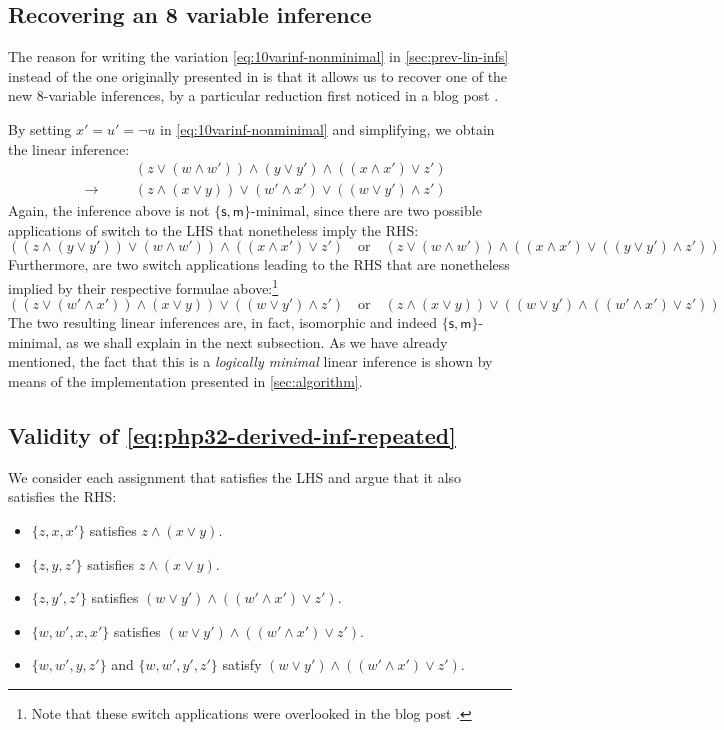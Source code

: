 \documentclass[a4paper, UKenglish, cleveref]{lipics-v2021}
\newcommand{\m}{\ensuremath{\mathsf{m}}}
\newcommand{\s}{\ensuremath{\mathsf{s}}}
\begin{document}
\subsection{Recovering an 8 variable inference}
\label{sect:reduction-10var-to-8var}
The reason for writing the variation \eqref{eq:10varinf-nonminimal} in \cref{sec:prev-lin-infs} instead of the one originally presented in \cite{Das13:lin-inf-rew} is that it allows us to recover one of the new 8-variable inferences, by a particular reduction first noticed in a blog post \cite{Das20:lin-inf-size-8}.

By setting $x' = u' = \lnot u$ in \eqref{eq:10varinf-nonminimal} and simplifying, we obtain the linear inference:
\begin{equation*}
\begin{alignedat}{2}
&&& (z \lor (w \land w')) \land (y \lor y') \land ((x \land x') \lor z') \\
&\to &\quad& (z \land (x \lor y)) \lor (w' \land x') \lor ((w \lor y') \land z')
\end{alignedat}
\end{equation*}
%
Again, the inference above is not $\{\s,\m\}$-minimal, since there are two possible applications of switch to the LHS that nonetheless imply the RHS:
\[
((z \land (y \lor y')) \lor (w \land w')) \land ((x \land x') \lor z')
\quad
\text{or}
\quad
(z \lor (w \land w')) \land ((x \land x') \lor ((y \lor y') \land z'))
\]
Furthermore, are two switch applications leading to the RHS that are nonetheless implied by their respective formulae above:\footnote{Note that these switch applications were overlooked in the blog post \cite{Das20:lin-inf-size-8}.}
\[
((z \lor (w' \land x')) \land (x \lor y)) \lor ((w \lor y') \land z')
\quad
\text{or}
\quad
(z \land (x \lor y)) \lor ((w \lor y') \land ((w' \land x') \lor z'))
\]
The two resulting linear inferences are, in fact, isomorphic and indeed $\{\s,\m\}$-minimal, as we shall explain in the next subsection.
%
As we have already mentioned, the fact that this is a \emph{logically minimal} linear inference is shown by means of the implementation presented in \cref{sec:algorithm}.

\subsection{Validity of \cref{eq:php32-derived-inf-repeated}}
\label{sec:app:validity-php32-derived}
We consider each assignment that satisfies the LHS and argue that it also satisfies the RHS:
\begin{itemize}
\item $\{z,x,x'\}$ satisfies $z\land (x \lor y)$.
\item $\{z,y,z'\}$ satisfies $z\land (x \lor y)$.
\item $\{z,y',z'\}$ satisfies $(w \lor y') \land ((w' \land x') \lor z')$.
\item $\{w, w', x, x'\}$ satisfies $(w \lor y') \land ((w' \land x') \lor z')$.
\item $\{w, w', y, z'\}$ and $\{w, w', y', z'\}$ satisfy $(w \lor y') \land ((w' \land x') \lor z')$.
\end{itemize}
\end{document}
